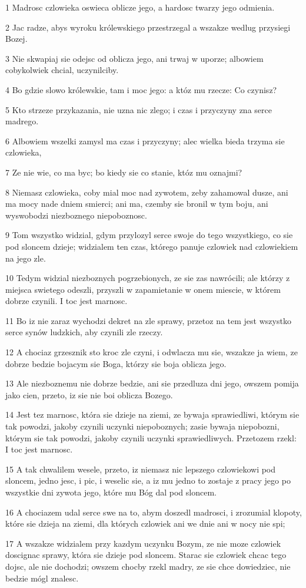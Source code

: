 \par 1 Madrosc czlowieka oswieca oblicze jego, a hardosc twarzy jego odmienia.
\par 2 Jac radze, abys wyroku królewskiego przestrzegal a wszakze wedlug przysiegi Bozej.
\par 3 Nie skwapiaj sie odejsc od oblicza jego, ani trwaj w uporze; albowiem cobykolwiek chcial, uczynilciby.
\par 4 Bo gdzie slowo królewskie, tam i moc jego: a któz mu rzecze: Co czynisz?
\par 5 Kto strzeze przykazania, nie uzna nic zlego; i czas i przyczyny zna serce madrego.
\par 6 Albowiem wszelki zamysl ma czas i przyczyny; alec wielka bieda trzyma sie czlowieka,
\par 7 Ze nie wie, co ma byc; bo kiedy sie co stanie, któz mu oznajmi?
\par 8 Niemasz czlowieka, coby mial moc nad zywotem, zeby zahamowal dusze, ani ma mocy nade dniem smierci; ani ma, czemby sie bronil w tym boju, ani wyswobodzi niezboznego niepoboznosc.
\par 9 Tom wszystko widzial, gdym przylozyl serce swoje do tego wszystkiego, co sie pod sloncem dzieje; widzialem ten czas, którego panuje czlowiek nad czlowiekiem na jego zle.
\par 10 Tedym widzial niezboznych pogrzebionych, ze sie zas nawrócili; ale którzy z miejsca swietego odeszli, przyszli w zapamietanie w onem miescie, w którem dobrze czynili. I toc jest marnosc.
\par 11 Bo iz nie zaraz wychodzi dekret na zle sprawy, przetoz na tem jest wszystko serce synów ludzkich, aby czynili zle rzeczy.
\par 12 A chociaz grzesznik sto kroc zle czyni, i odwlacza mu sie, wszakze ja wiem, ze dobrze bedzie bojacym sie Boga, którzy sie boja oblicza jego.
\par 13 Ale niezboznemu nie dobrze bedzie, ani sie przedluza dni jego, owszem pomija jako cien, przeto, iz sie nie boi oblicza Bozego.
\par 14 Jest tez marnosc, która sie dzieje na ziemi, ze bywaja sprawiedliwi, którym sie tak powodzi, jakoby czynili uczynki niepoboznych; zasie bywaja niepobozni, którym sie tak powodzi, jakoby czynili uczynki sprawiedliwych. Przetozem rzekl: I toc jest marnosc.
\par 15 A tak chwalilem wesele, przeto, iz niemasz nic lepszego czlowiekowi pod sloncem, jedno jesc, i pic, i weselic sie, a iz mu jedno to zostaje z pracy jego po wszystkie dni zywota jego, które mu Bóg dal pod sloncem.
\par 16 A chociazem udal serce swe na to, abym doszedl madrosci, i zrozumial klopoty, które sie dzieja na ziemi, dla których czlowiek ani we dnie ani w nocy nie spi;
\par 17 A wszakze widzialem przy kazdym uczynku Bozym, ze nie moze czlowiek doscignac sprawy, która sie dzieje pod sloncem. Starac sie czlowiek chcac tego dojsc, ale nie dochodzi; owszem chocby rzekl madry, ze sie chce dowiedziec, nie bedzie mógl znalesc.

